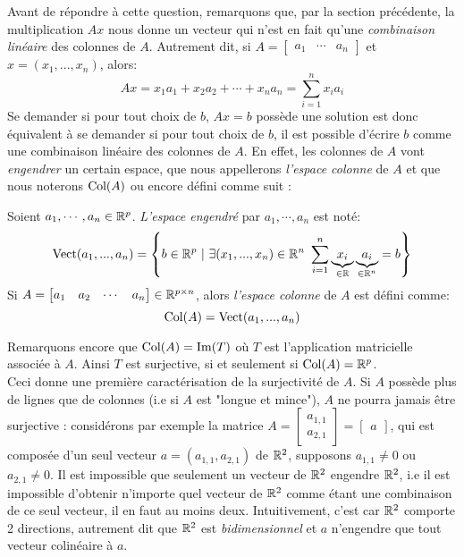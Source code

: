 \noindent Avant de répondre à cette question, remarquons que, par la section précédente, la multiplication $Ax$ nous donne un vecteur qui n'est en fait qu'une \textit{combinaison linéaire} des colonnes de $A$. Autrement dit, si $A = \begin{bmatrix} a_1 & \cdots & a_n\end{bmatrix}$ et $x = (x_1, ..., x_n)$, alors:
$$Ax = x_1 a_1 + x_2 a_2 + \cdots + x_n a_n = \sum_{i=1}^{n}x_i a_i$$
Se demander si pour tout choix de $b$, $Ax=b$ possède une solution est donc équivalent à se demander si pour tout choix de $b$, il est possible d'écrire $b$ comme une combinaison linéaire des colonnes de $A$. En effet, les colonnes de $A$ vont \textit{engendrer} un certain espace, que nous appellerons \textit{l'espace colonne} de $A$ et que nous noterons $\text{Col}(A)$ ou encore  défini comme suit :
\begin{boxdef} \label{def:vecteng}
Soient $a_1, \cdots, a_n \in \mathbb{R}^p$. \textit{L'espace engendré} par $a_1, \cdots, a_n$ est noté:
$$\operatorname{Vect}(a_1, ..., a_n) =\left\{b \in \mathbb{R}^p \ | \ \exists (x_1, ..., x_n) \in \mathbb{R}^n \ \sum_{i=1}^n \underbrace{x_i}_{\in \mathbb{R}}\underbrace{a_i}_{\in \mathbb{R}^n} = b\right\} $$
Si $A = \begin{bmatrix} a_1 & a_2 & \cdots & a_n \end{bmatrix} \in \mathbb{R}^{p \times n}$, alors \textit{l'espace colonne} de $A$ est défini comme:
$$\text{Col}(A) = \operatorname{Vect}(a_1, ..., a_n)$$
\end{boxdef}
Remarquons encore que $\text{Col}(A) = \operatorname{Im}(T)$ où $T$ est l'application matricielle associée à $A$. Ainsi $T$ est surjective, si et seulement si $\text{Col}(A) = \mathbb{R}^p$. \\
Ceci donne une première caractérisation de la surjectivité de $A$. Si $A$ possède plus de lignes que de colonnes (i.e si $A$ est "longue et mince"), $A$ ne pourra jamais être surjective : considérons par exemple la matrice $A = \begin{bmatrix}
a_{1,1} \\
a_{2,1} \end{bmatrix} = \begin{bmatrix}
a
\end{bmatrix}$, qui est composée d'un seul vecteur $a = (a_{1,1}, a_{2,1})$ de $\mathbb{R}^2$, supposons $a_{1,1} \neq 0$ ou $a_{2,1} \neq 0$. Il est impossible que seulement un vecteur de $\mathbb{R}^2$ engendre $\mathbb{R}^2$, i.e il est impossible d'obtenir n'importe quel vecteur de $\mathbb{R}^2$ comme étant une combinaison de ce seul vecteur, il en faut au moins deux. Intuitivement, c'est car $\mathbb{R}^2$ comporte 2 directions, autrement dit que $\mathbb{R}^2$ est \textit{bidimensionnel} et $a$ n'engendre que tout vecteur colinéaire à $a$. \\
